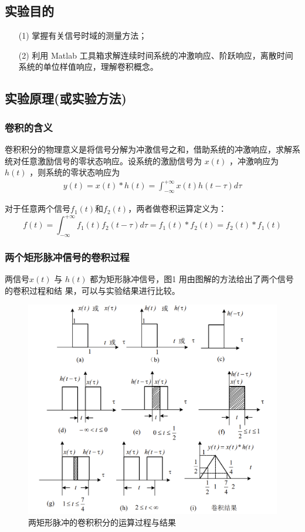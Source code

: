 \documentclass[UTF8,AutoFakeBold]{ctexart}
\begin{document}
	\subsection{{\heiti{}实验目的}}
	\begin{enumerate}
		\item [(1)] 掌握有关信号时域的测量方法；
		\item [(2)] 利用 Matlab 工具箱求解连续时间系统的冲激响应、阶跃响应，离散时间系统的单位样值响应，理解卷积概念。
	\end{enumerate}
	\subsection{{\heiti{}实验原理(或实验方法)}}
	\subsubsection{{\heiti{}卷积的含义}}
		卷积积分的物理意义是将信号分解为冲激信号之和，借助系统的冲激响应，求解系统对任意激励信号的零状态响应。设系统的激励信号为
		$x(t)$ ，冲激响应为 $h(t)$ ，则系统的零状态响应为
		\begin{align}
		y(t)=x(t)*h(t)= \int_{-\infty}^{+\infty}x(t)h(t-\tau )d\tau
		\end{align}\par
		对于任意两个信号$f_1(t)$和$f_2(t)$，两者做卷积运算定义为：
		\begin{equation}
		f(t)=\int_{-\infty}^{+\infty}f_1(t)f_2(t-\tau)d\tau=f_1(t)*f_2(t)=f_2(t)*f_1(t)
		\end{equation}\par

	\subsubsection{\heiti{}两个矩形脉冲信号的卷积过程}
		两信号$x(t)$ 与 $h(t)$ 都为矩形脉冲信号，图1 用由图解的方法给出了两个信号的卷积过程和结
	果，可以与实验结果进行比较。
		\begin{figure}[ht]
			\centering
			\includegraphics[scale=0.4]{./figures/photo1.png}
			\caption{两矩形脉冲的卷积积分的运算过程与结果}
		\end{figure}
\end{document}

